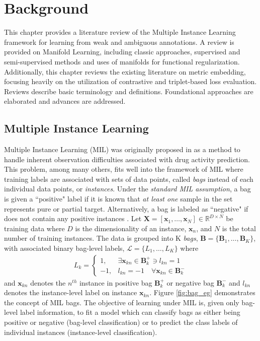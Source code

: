\chapter{Background}

This chapter provides a literature review of the Multiple Instance Learning framework for learning from weak and ambiguous annotations.  A review is provided on Manifold Learning, including classic approaches, supervised and semi-supervised methods and uses of manifolds for functional regularization. Additionally, this chapter reviews the existing literature on metric embedding, focusing heavily on the utilization of contrastive and triplet-based loss evaluation.  Reviews describe basic terminology and definitions.  Foundational approaches are elaborated and advances are addressed.

\section{Multiple Instance Learning}

Multiple Instance Learning (MIL) was originally proposed in \citep{Dietterich1996AxisParallelRectangles} as a method to handle inherent observation difficulties associated with drug activity prediction.  This problem, among many others, fits well into the framework of MIL where training labels are associated with sets of data points, called \textit{bags} instead of each individual data points, or \textit{instances}.  Under the \textit{standard MIL assumption}, a bag is given a ``positive" label if it is known that  \textit{at least one} sample in the set represents pure or partial target.  Alternatively, a bag is labeled as ``negative" if does not contain any positive instances \citep{Carbonneau2016MILSurvey}.  Let $\bm{X}=[\bm{x}_1,\dots, \bm{x}_N] \in \mathbb{R}^{D \times N}$ be training data where $D$ is the dimensionality of an instance, $\bm{x}_n$, and $N$ is the total number of training instances.  The data is grouped into K \textit{bags}, $\bm{B} = \{\bm{B}_1, \dots, \bm{B}_K\}$, with associated binary bag-level labels, $\mathcal{L} = \{L_1, \dots, L_K \}$ where 
\begin{align}
	L_k = \begin{cases} 
	1, & \exists \bm{x}_{kn} \in \bm{B}^{+}_{k} \ni  l_{kn} = 1\\
	-1, & l_{kn} = -1 \quad \forall \bm{x}_{kn} \in \bm{B}^{-}_{k} 
	\end{cases}
\end{align} and $\bm{x}_{kn}$ denotes the $n^{th}$ instance in positive bag $\bm{B}^{+}_{k}$ or negative bag $\bm{B}^{-}_{k}$ \citep{Zare2016MIACE} and $l_{kn}$ denotes the instance-level label on instance $\bm{x}_{kn}$.  Figure \ref{fig:bag_eg} demonstrates the concept of MIL bags.  The objective of learning under MIL is, given only bag-level label information, to fit a model which can classify bags as either being positive or negative (bag-level classification) or to predict the class labels of individual instances (instance-level classification).

